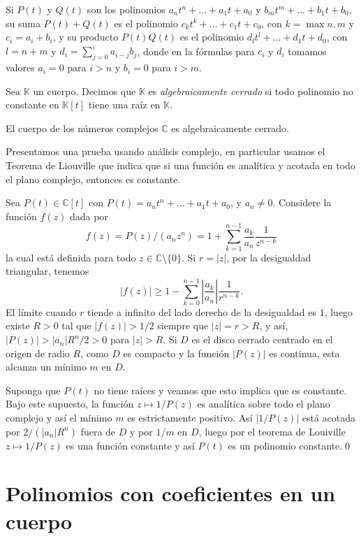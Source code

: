 \begin{obs}
  Si $P(t)$ y $Q(t)$ son los polinomios $a_nt^n+\ldots+a_1t+a_0$ y $b_mt^m+\ldots+b_1t+b_0$,
  su suma $P(t)+Q(t)$ es el polinomio $c_kt^k+\ldots+c_1t+c_0$, con $k=\max{n,m}$ y $c_i=a_i+b_i$, y su producto $P(t)Q(t)$ es el polinomio $d_lt^l+\ldots+d_1t+d_0$, con $l=n+m$ y $d_i=\sum_{j=0}^{i}a_{i-j}b_j$, donde en la fórmulas para $c_i$ y $d_i$ tomamos valores $a_i=0$ para $i>n$ y $b_i=0$ para $i>m$.
\end{obs}

\begin{defn}
Sea $\mathbb{K}$ un cuerpo. Decimos que $\mathbb{K}$ es \emph{algebraicamente cerrado} si todo polinomio no constante en $\mathbb{K}[t]$ tiene una raíz en $\mathbb{K}$.
\end{defn}

\begin{teo}
El cuerpo de los números complejos $\mathbb{C}$ es algebraicamente cerrado.
\end{teo}

\dem Presentamos una prueba usando análisis complejo, en particular usamos el Teorema de Liouville que indica que si una función es analítica y acotada en todo el plano complejo, entonces es constante.

Sea $P(t)\in\mathbb{C}[t]$ con $P(t)=a_nt^n+\ldots+a_1t+a_0$, y $a_n\ne 0$. Considere la función $f(z)$ dada por 
$$f(z)=P(z)/(a_nz^n)=1+\sum_{k=1}^{n-1}\dfrac{a_k}{a_n}\dfrac{1}{z^{n-k}}$$
la cual está definida para todo $z\in\mathbb{C}\setminus\{0\}$. Si $r=|z|$, por la desigualdad triangular, tenemos
$$ |f(z)| \ge 1-\sum_{k=0}^{n-1}\left|\dfrac{a_k}{a_n}\right|\dfrac{1}{r^{n-k}}.$$
El límite cuando $r$ tiende a infinito del lado derecho de la desigualdad es $1$, luego existe $R>0$ tal que $|f(z)|>1/2$ siempre que $|z|=r>R$, y así, $|P(z)|>|a_n|R^n/2>0$ para $|z|>R$. Si $D$ es el disco cerrado centrado en el origen de radio $R$, como $D$ es compacto y la función $|P(z)|$ es continua, esta alcanza un mínimo $m$ en $D$.

Suponga que $P(t)$ no tiene raíces y veamos que esto implica que es constante. Bajo este supuesto, la función $z\mapsto 1/P(z)$ es analítica sobre todo el plano complejo y así el mínimo $m$ es estrictamente positivo. Así $|1/P(z)|$ está acotada por $2/(|a_n|R^n)$ fuera de $D$ y por $1/m$ en $D$, luego por el teorema de Louiville $z\mapsto 1/P(z)$ es una función constante y así $P(t)$ es un polinomio constante.\qed

\section*{Polinomios con coeficientes en un cuerpo}

